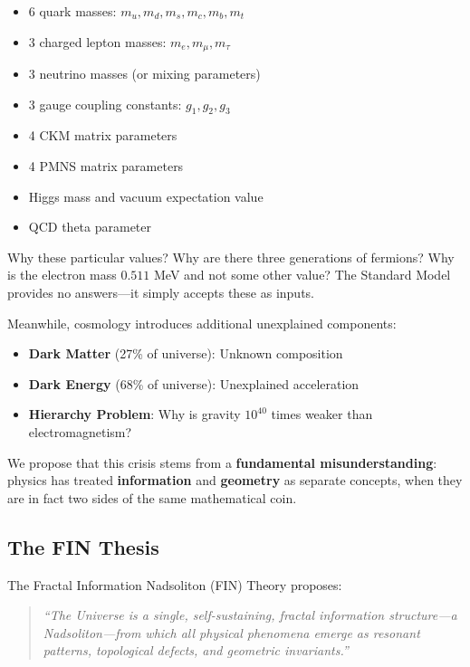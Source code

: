 \documentclass[11pt, a4paper]{article}
\theoremstyle{remark}
\begin{document}
\begin{itemize}
    \item 6 quark masses: $m_u, m_d, m_s, m_c, m_b, m_t$
    \item 3 charged lepton masses: $m_e, m_\mu, m_\tau$
    \item 3 neutrino masses (or mixing parameters)
    \item 3 gauge coupling constants: $g_1, g_2, g_3$
    \item 4 CKM matrix parameters
    \item 4 PMNS matrix parameters
    \item Higgs mass and vacuum expectation value
    \item QCD theta parameter
\end{itemize}

Why these particular values? Why are there three generations of fermions? Why is the electron mass $0.511$ MeV and not some other value? The Standard Model provides no answers—it simply accepts these as inputs.

Meanwhile, cosmology introduces additional unexplained components:
\begin{itemize}
    \item \textbf{Dark Matter} (27\% of universe): Unknown composition
    \item \textbf{Dark Energy} (68\% of universe): Unexplained acceleration
    \item \textbf{Hierarchy Problem}: Why is gravity $10^{40}$ times weaker than electromagnetism?
\end{itemize}

We propose that this crisis stems from a \textbf{fundamental misunderstanding}: physics has treated \textbf{information} and \textbf{geometry} as separate concepts, when they are in fact two sides of the same mathematical coin.

\subsection{The FIN Thesis}

The Fractal Information Nadsoliton (FIN) Theory proposes:

\begin{quote}
\textit{``The Universe is a single, self-sustaining, fractal information structure—a Nadsoliton—from which all physical phenomena emerge as resonant patterns, topological defects, and geometric invariants.''}
\end{quote}
\end{document}
